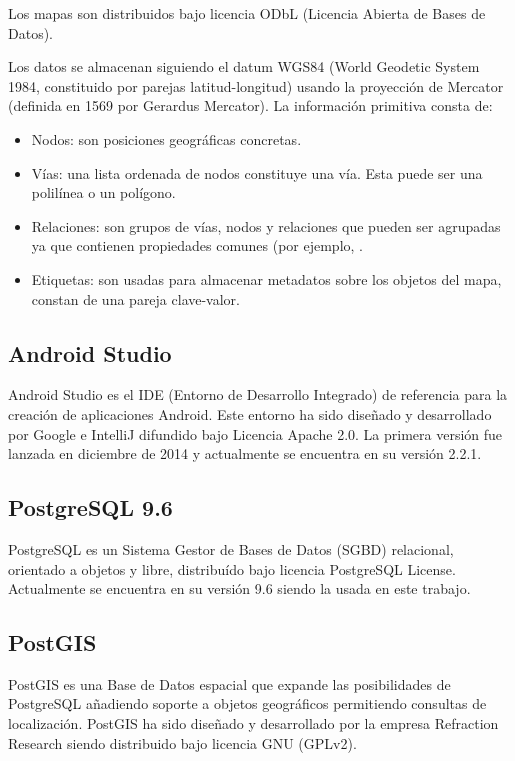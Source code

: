 Los mapas son distribuidos bajo licencia ODbL (Licencia Abierta de Bases de Datos).

Los datos se almacenan siguiendo el datum WGS84 (World Geodetic System 1984, constituido por parejas latitud-longitud) usando la proyección de Mercator (definida en 1569  por Gerardus Mercator). La información primitiva consta de:

\begin{itemize}
	\item Nodos: son posiciones geográficas concretas.
	\item Vías: una lista ordenada de nodos constituye una vía. Esta puede ser una polilínea o un polígono.
	\item Relaciones: son grupos de vías, nodos y relaciones que pueden ser agrupadas ya que contienen propiedades comunes (por ejemplo, .
	\item Etiquetas: son usadas para almacenar metadatos sobre los objetos del mapa, constan de una pareja clave-valor. 
\end{itemize}

\subsection{Android Studio}
Android Studio es el IDE (Entorno de Desarrollo Integrado) de referencia para la creación de aplicaciones Android. Este entorno ha sido diseñado y desarrollado por Google e IntelliJ difundido bajo Licencia Apache 2.0.
La primera versión fue lanzada en diciembre de 2014 y actualmente se encuentra en su versión 2.2.1.

\subsection{PostgreSQL 9.6}
PostgreSQL es un Sistema Gestor de Bases de Datos (SGBD) relacional, orientado a objetos y libre, distribuído bajo licencia PostgreSQL License. Actualmente se encuentra en su versión 9.6 siendo la usada en este trabajo.

\subsection{PostGIS}
PostGIS es una Base de Datos espacial que expande las posibilidades de PostgreSQL añadiendo soporte a objetos geográficos permitiendo consultas de localización. PostGIS ha sido diseñado y desarrollado por la empresa Refraction Research siendo distribuido bajo licencia GNU (GPLv2).

